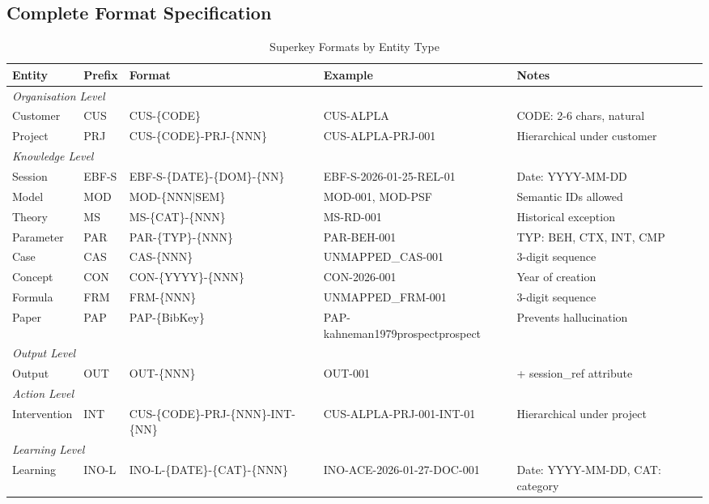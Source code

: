 \subsection{Complete Format Specification}

\begin{table}[htbp]
\centering
\caption{Superkey Formats by Entity Type}
\label{tab:superkey-formats}
\renewcommand{\arraystretch}{1.4}
\begin{tabular}{@{}llllp{3.5cm}@{}}
\toprule
\textbf{Entity} & \textbf{Prefix} & \textbf{Format} & \textbf{Example} & \textbf{Notes} \\
\midrule
\multicolumn{5}{l}{\textit{Organisation Level}} \\
Customer & CUS & CUS-\{CODE\} & CUS-ALPLA & CODE: 2-6 chars, natural \\
Project & PRJ & CUS-\{CODE\}-PRJ-\{NNN\} & CUS-ALPLA-PRJ-001 & Hierarchical under customer \\
\midrule
\multicolumn{5}{l}{\textit{Knowledge Level}} \\
Session & EBF-S & EBF-S-\{DATE\}-\{DOM\}-\{NN\} & EBF-S-2026-01-25-REL-01 & Date: YYYY-MM-DD \\
Model & MOD & MOD-\{NNN$|$SEM\} & MOD-001, MOD-PSF & Semantic IDs allowed \\
Theory & MS & MS-\{CAT\}-\{NNN\} & MS-RD-001 & Historical exception \\
Parameter & PAR & PAR-\{TYP\}-\{NNN\} & PAR-BEH-001 & TYP: BEH, CTX, INT, CMP \\
Case & CAS & CAS-\{NNN\} & UNMAPPED_CAS-001 & 3-digit sequence \\
Concept & CON & CON-\{YYYY\}-\{NNN\} & CON-2026-001 & Year of creation \\
Formula & FRM & FRM-\{NNN\} & UNMAPPED_FRM-001 & 3-digit sequence \\
Paper & PAP & PAP-\{BibKey\} & PAP-kahneman1979prospectprospect & Prevents hallucination \\
\midrule
\multicolumn{5}{l}{\textit{Output Level}} \\
Output & OUT & OUT-\{NNN\} & OUT-001 & + session\_ref attribute \\
\midrule
\multicolumn{5}{l}{\textit{Action Level}} \\
Intervention & INT & CUS-\{CODE\}-PRJ-\{NNN\}-INT-\{NN\} & CUS-ALPLA-PRJ-001-INT-01 & Hierarchical under project \\
\midrule
\multicolumn{5}{l}{\textit{Learning Level}} \\
Learning & INO-L & INO-L-\{DATE\}-\{CAT\}-\{NNN\} & INO-ACE-2026-01-27-DOC-001 & Date: YYYY-MM-DD, CAT: category \\
\bottomrule
\end{tabular}
\end{table}

